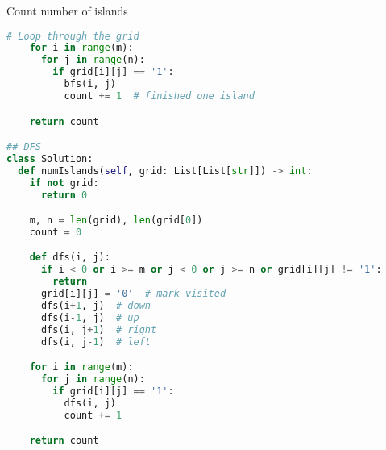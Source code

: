 \documentclass[a4paper,12pt]{article}
\begin{document}
\begin{multicols}{2}
\begin{mycode}[label={lst:add-two-numbers}]{Count number of islands}
\begin{lstlisting}[language=Python]
    # Loop through the grid
    for i in range(m):
      for j in range(n):
        if grid[i][j] == '1':
          bfs(i, j)
          count += 1  # finished one island

    return count

## DFS
class Solution:
  def numIslands(self, grid: List[List[str]]) -> int:
    if not grid:
      return 0

    m, n = len(grid), len(grid[0])
    count = 0

    def dfs(i, j):
      if i < 0 or i >= m or j < 0 or j >= n or grid[i][j] != '1':
        return
      grid[i][j] = '0'  # mark visited
      dfs(i+1, j)  # down
      dfs(i-1, j)  # up
      dfs(i, j+1)  # right
      dfs(i, j-1)  # left

    for i in range(m):
      for j in range(n):
        if grid[i][j] == '1':
          dfs(i, j)
          count += 1

    return count
\end{lstlisting}
\end{mycode}

\end{multicols}
\end{document}

